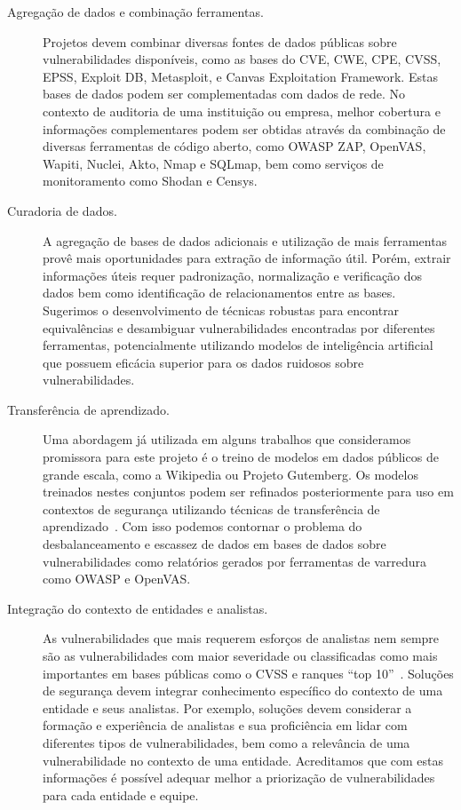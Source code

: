 \begin{description}

    \item[Agregação de dados e combinação ferramentas.]  Projetos devem combinar diversas fontes de dados públicas sobre vulnerabilidades disponíveis, como as bases do CVE, CWE, CPE, CVSS, EPSS, Exploit DB, Metasploit, e Canvas Exploitation Framework.  Estas bases de dados podem ser complementadas com dados de rede.  No contexto de auditoria de uma instituição ou empresa, melhor cobertura e informações complementares podem ser obtidas através da combinação de diversas ferramentas de código aberto, como OWASP ZAP, OpenVAS, Wapiti, Nuclei, Akto, Nmap e SQLmap, bem como serviços de monitoramento como Shodan e Censys.

    \item[Curadoria de dados.] A agregação de bases de dados adicionais e utilização de mais ferramentas provê mais oportunidades para extração de informação útil.  Porém, extrair informações úteis requer padronização, normalização e verificação dos dados bem como identificação de relacionamentos entre as bases.  Sugerimos o desenvolvimento de técnicas robustas para encontrar equivalências e desambiguar vulnerabilidades encontradas por diferentes ferramentas, potencialmente utilizando modelos de inteligência artificial que possuem eficácia superior para os dados ruidosos sobre vulnerabilidades.

    \item[Transferência de aprendizado.]  Uma abordagem já utilizada em alguns trabalhos que consideramos promissora para este projeto é o treino de modelos em dados públicos de grande escala, como a Wikipedia ou Projeto Gutemberg.  Os modelos treinados nestes conjuntos podem ser refinados posteriormente para uso em contextos de segurança utilizando técnicas de transferência de aprendizado~\cite{yin2020apply}.  Com isso podemos contornar o problema do desbalanceamento e escassez de dados em bases de dados sobre vulnerabilidades como relatórios gerados por ferramentas de varredura como OWASP e OpenVAS.

    \item[Integração do contexto de entidades e analistas.] As vulnerabilidades que mais requerem esforços de analistas nem sempre são as vulnerabilidades com maior severidade ou classificadas como mais importantes em bases públicas como o CVSS e ranques ``top 10''~\cite{le21qa}.  Soluções de segurança devem integrar conhecimento específico do contexto de uma entidade e seus analistas.  Por exemplo, soluções devem considerar a formação e experiência de analistas e sua proficiência em lidar com diferentes tipos de vulnerabilidades, bem como a relevância de uma vulnerabilidade no contexto de uma entidade.  Acreditamos que com estas informações é possível adequar melhor a priorização de vulnerabilidades para cada entidade e equipe.


\end{description}
